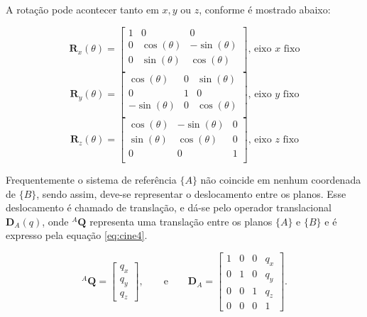     A rotação pode acontecer tanto em $x, y$ ou $z$, conforme é mostrado abaixo:

    \begin{equation*}
        \mathbf{R}_x(\theta) =
        \begin{bmatrix}
            1 & 0            & 0             \\
            0 & \cos(\theta) & -\sin(\theta) \\
            0 & \sin(\theta) & \cos(\theta)  \\
        \end{bmatrix} \text{, eixo $x$ fixo}
    \end{equation*}
    \begin{equation*}
        \mathbf{R}_y(\theta) =
        \begin{bmatrix}
            \cos(\theta)  & 0 & \sin(\theta) \\
            0             & 1 & 0            \\
            -\sin(\theta) & 0 & \cos(\theta) \\
        \end{bmatrix} \text{, eixo $y$ fixo}
    \end{equation*}
    \begin{equation*}
        \mathbf{R}_z(\theta) =
        \begin{bmatrix}
            \cos(\theta) & -\sin(\theta) & 0 \\
            \sin(\theta) & \cos(\theta) & 0 \\
            0            & 0            & 1 \\
        \end{bmatrix} \text{, eixo $z$ fixo}
    \end{equation*}

    Frequentemente o sistema de referência $\{A\}$ não coincide em nenhum coordenada de $\{B\}$, sendo assim, deve-se representar o deslocamento entre os planos. Esse deslocamento é chamado de translação, e dá-se pelo operador translacional $\mathbf{D}_A(q)$, onde ${}^A\mathbf{Q}$ representa uma translação entre os planos $\{A\}$ e $\{B\}$ e é expresso pela equação \eqref{eq:cine4}.

    \begin{equation}\label{eq:cine4}
    {}^A\mathbf{Q} =
    \begin{bmatrix}
    q_x\\ q_y \\ q_z
    \end{bmatrix}, \qquad \mathrm{e} \qquad
    \mathbf{D}_A = 
    \begin{bmatrix}
    1 & 0 & 0 & q_x\\
    0 & 1 & 0 & q_y\\
    0 & 0 & 1 & q_z\\
    0 & 0 & 0 & 1
    \end{bmatrix}.
    \end{equation}
    

